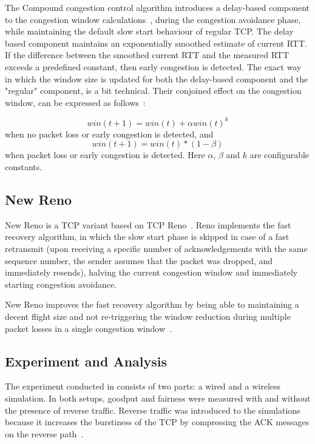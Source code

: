 The Compound congestion control algorithm introduces a delay-based component to the congestion window calculations~\cite{Tan05}, during the congestion avoidance phase, while maintaining the default slow start behaviour of regular TCP. The delay based component maintains an exponentially smoothed estimate of current RTT. If the difference between the smoothed current RTT and the measured RTT exceeds a predefined constant, then early congestion is detected. The exact way in which the window size is updated for both the delay-based component and the "regular" component, is a bit technical. Their conjoined effect on the congestion window, can be expressed as follows~\cite{Tan05}:

\[
win(t + 1) = win(t) + \alpha win(t)^k
\]
when no packet loss or early congestion is detected, and
\[
win(t + 1) = win(t) * (1 - \beta)
\]
when packet loss or early congestion is detected. Here $\alpha$, $\beta$ and $k$ are configurable constants. 
  
\subsection{New Reno}

New Reno is a TCP variant based on TCP Reno~\cite{rfc6582}. Reno implements the fast recovery algorithm, in which the slow start phase is skipped in case of a fast retransmit (upon receiving a specific number of acknowledgements with the same sequence number, the sender assumes that the packet was dropped, and immediately resends), halving the current congestion window and immediately starting congestion avoidance. 

New Reno improves the fast recovery algorithm by being able to maintaining a decent flight size and not re-triggering the window reduction during multiple packet losses in a single congestion window~\cite{rfc6582}.  

\subsection{Experiment and Analysis}

The experiment conducted in \cite{Abdeljaouad10} consists of two parts: a wired and a wireless simulation. In both setups, goodput and fairness were measured with and without the presence of reverse traffic. Reverse traffic was introduced to the simulations because it increases the burstiness of the TCP by compressing the ACK messages on the reverse path~\cite{Abdeljaouad10}. 

